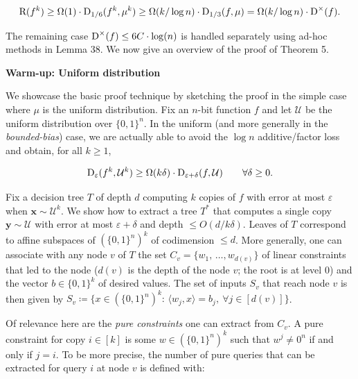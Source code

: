 \documentclass[10pt,a4paper]{article}
\begin{document}
\[\begin{gathered}
{\textup{R}}(f^{k})\geq\Omega(1)\cdot{\textup{D}}_{1/6}(f^{k},\mu^{k})\geq\Omega(k/\log n)\cdot{\textup{D}}_{1/3}(f,\mu)=\Omega(k/\log n)\cdot{\textup{D}}^{\times}(f).
\end{gathered}\]


The remaining case ${\textup{D}}^{\times}(f)\leq 6C\cdot\log(n)$ is handled separately using ad-hoc methods in Lemma 38. We now give an overview of the proof of Theorem 5.\par




\par\medskip\noindent\textbf{Warm-up: Uniform distribution}\par




We showcase the basic proof technique by sketching the proof in the simple case where $\mu$ is the uniform distribution.
Fix an $n$-bit function $f$ and let $\mathcal{U}$ be the uniform distribution over $\{0,1\}^{n}$. In the uniform (and more generally in the \emph{bounded-bias}) case, we are actually able to avoid the $\log n$ additive/factor loss and obtain, for all $k\geq 1$,\par


\[\begin{gathered}
{\textup{D}}_{\varepsilon}(f^{k},\mathcal{U}^{k})\geq\Omega(k\delta)\cdot{\textup{D}}_{\varepsilon+\delta}(f,\mathcal{U})\qquad\forall\delta\geq 0.
\end{gathered}\]


Fix a decision tree $T$ of depth $d$ computing $k$ copies of $f$ with error at most $\varepsilon$ when $\bm{x}\sim\mathcal{U}^{k}$. We show how to extract a tree $T^{*}$ that computes a single copy $\bm{y}\sim\mathcal{U}$ with error at most $\varepsilon+\delta$ and depth $\leq O(d/k\delta)$. Leaves of $T$ correspond to affine subspaces of $(\{0,1\}^{n})^{k}$ of codimension $\leq d$. More generally, one can associate with any node $v$ of $T$ the set $C_{v}=\{w_{1},\,\dots,w_{d(v)}\}$ of linear constraints that led to the node ($d(v)$ is the depth of the node $v$; the root is at level 0) and the vector $b\in\{0,1\}^{k}$ of desired values. The set of inputs $S_{v}$ that reach node $v$ is then given by $S_{v}\coloneqq\{x\in(\{0,1\}^{n})^{k}:\,\langle w_{j},x\rangle=b_{j},\ \forall
j\in[d(v)]\}$.\par




Of relevance here are the \emph{pure constraints} one can extract from $C_{v}$. A pure constraint for copy $i\in[k]$ is some $w\in(\{0,1\}^{n})^{k}$ such that $w^{j}\neq 0^{n}$ if and only if $j=i$. To be more precise, the number of pure queries that can be extracted for query $i$ at node $v$ is defined with:\par
\end{document}
